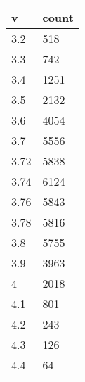 \begin{table}[H]
    \centering
    \begin{tabular}{|l|l|}
    \hline
        v & count \\ \hline
        3.2 & 518 \\ \hline
        3.3 & 742 \\ \hline
        3.4 & 1251 \\ \hline
        3.5 & 2132 \\ \hline
        3.6 & 4054 \\ \hline
        3.7 & 5556 \\ \hline
        3.72 & 5838 \\ \hline
        3.74 & 6124 \\ \hline
        3.76 & 5843 \\ \hline
        3.78 & 5816 \\ \hline
        3.8 & 5755 \\ \hline
        3.9 & 3963 \\ \hline
        4 & 2018 \\ \hline
        4.1 & 801 \\ \hline
        4.2 & 243 \\ \hline
        4.3 & 126 \\ \hline
        4.4 & 64 \\ \hline
    \end{tabular}
\end{table}